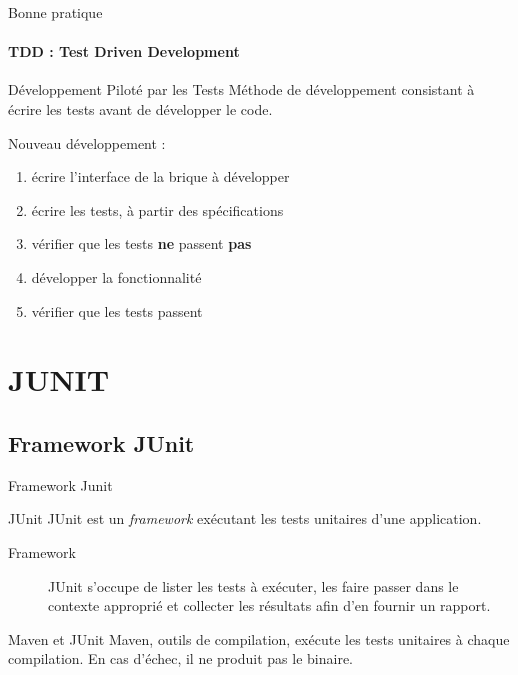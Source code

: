 \documentclass[compress]{beamer}%
\begin{document}
\begin{frame}{Bonne pratique}
	\framesubtitle{TDD : Test Driven Development}

	\begin{block}{Développement Piloté par les Tests}
		Méthode de développement consistant à écrire les tests avant de développer le code.
	\end{block}
	
	\pause
	Nouveau développement : 
	\begin{enumerate}
		\item écrire l'interface de la brique à développer
		\item écrire les tests, à partir des spécifications
		\item vérifier que les tests \textbf{ne} passent \textbf{pas}
		\item développer la fonctionnalité
		\item vérifier que les tests passent
	\end{enumerate}
	
\end{frame}


\section{JUNIT}

\subsection{Framework JUnit}

\begin{frame}{Framework Junit}

	\begin{block}{JUnit}
		JUnit est un \emph{framework} exécutant les tests unitaires d'une application.
	\end{block}
	
	\pause
	\begin{description}
	\item[Framework] JUnit s'occupe de lister les tests à exécuter, les faire passer dans le contexte approprié et collecter les résultats afin d'en fournir un rapport.
	\end{description}
	
	\pause
	\begin{block}{Maven et JUnit}
		Maven, outils de compilation, exécute les tests unitaires à chaque compilation. En cas d'échec, il ne produit pas le binaire.
	\end{block}

\end{frame}
\end{document}
